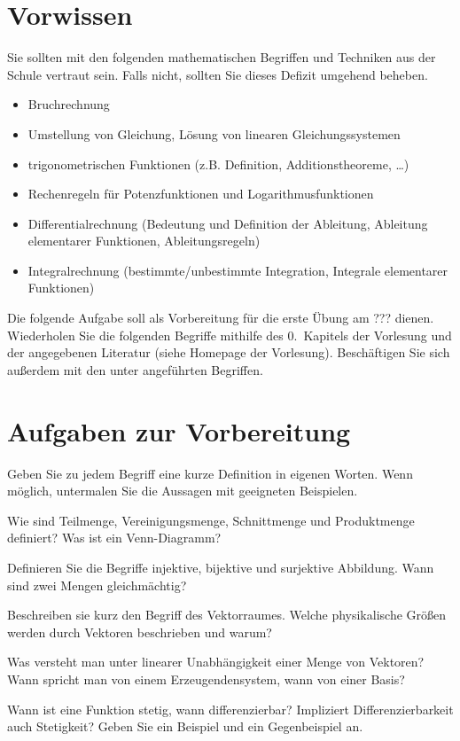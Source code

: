 \documentclass[11pt]{scrartcl}
\begin{document}
\section*{Vorwissen}
Sie sollten mit den folgenden mathematischen Begriffen und Techniken aus der Schule vertraut sein. Falls nicht, sollten Sie dieses Defizit umgehend beheben.
\begin{itemize}
  \item Bruchrechnung
  \item Umstellung von Gleichung, Lösung von linearen Gleichungssystemen
  \item trigonometrischen Funktionen (z.B. Definition, Additionstheoreme, \ldots)
  \item Rechenregeln für Potenzfunktionen und Logarithmusfunktionen
  \item Differentialrechnung (Bedeutung und Definition der Ableitung, Ableitung elementarer Funktionen, Ableitungsregeln)
  \item Integralrechnung (bestimmte/unbestimmte Integration, Integrale elementarer Funktionen)
\end{itemize}
\vspace{1em}

Die folgende Aufgabe soll als Vorbereitung für die erste Übung am ??? dienen.
Wiederholen Sie die folgenden Begriffe mithilfe des 0.\ Kapitels der Vorlesung und der angegebenen Literatur (siehe Homepage der Vorlesung).
Beschäftigen Sie sich außerdem mit den unter  angeführten Begriffen.

\section*{Aufgaben zur Vorbereitung}
Geben Sie zu jedem Begriff eine kurze Definition in eigenen Worten.
Wenn möglich, untermalen Sie die Aussagen mit geeigneten Beispielen.

\begin{description}[leftmargin=1cm,labelindent=1cm]
  \item[Mengen] Wie sind Teilmenge, Vereinigungsmenge, Schnittmenge und Produktmenge definiert?
  Was ist ein Venn-Diagramm?
  \item[Abbildungen] Definieren Sie die Begriffe injektive, bijektive und surjektive Abbildung. 
  Wann sind zwei Mengen gleichmächtig?
  \item[Vektorraum] Beschreiben sie kurz den Begriff des Vektorraumes. 
  Welche physikalische Größen werden durch Vektoren beschrieben und warum?
  \item[Lineare Unabhängigkeit] Was versteht man unter linearer Unabhängigkeit einer Menge von Vektoren? 
  Wann spricht man von einem Erzeugendensystem, wann von einer Basis? 
  \item[Stetigkeit und Differenzierbarkeit] Wann ist eine Funktion stetig, wann differenzierbar? 
  Impliziert Differenzierbarkeit auch Stetigkeit? 
  Geben Sie ein Beispiel und ein Gegenbeispiel an.
\end{description}
\end{document}
